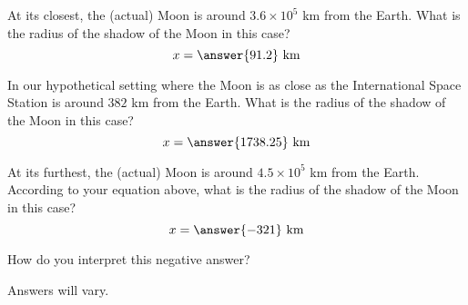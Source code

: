 \documentclass{ximera}
\begin{document}
\begin{problem}
  At its closest, the (actual) Moon is around $3.6\times 10^5$ km from
  the Earth.  What is the radius of the shadow of the Moon in this
  case?
  \[
  x = \answer{91.2} \text{ km}
  \]
\end{problem}

\begin{problem}
  In our hypothetical setting where the Moon is as close as the
  International Space Station is around $382$ km from the Earth.  What
  is the radius of the shadow of the Moon in this case?
  \[
  x = \answer{1738.25} \text{ km}
  \]
\end{problem}



\begin{problem}
  At its furthest, the (actual) Moon is around $4.5\times 10^5$ km
  from the Earth.  According to your equation above, what is the
  radius of the shadow of the Moon in this case?
  \[
  x = \answer{-321} \text{ km}
  \]
  \begin{problem}
    How do you interpret this negative answer?
    \begin{freeResponse}
      Answers will vary.
    \end{freeResponse}
  \end{problem}
\end{problem}
\end{document}
